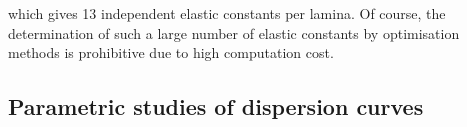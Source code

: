 	which gives 13 independent elastic constants per lamina. 
	Of course, the determination of such a large number of elastic constants by optimisation methods is prohibitive due to high computation cost. 
	

\subsection{}
\subsection{Parametric studies of dispersion curves \label{sec:parametric}}
